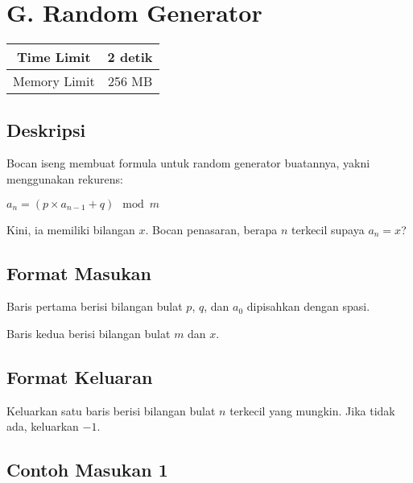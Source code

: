 \documentclass{article}
\begin{document}
\section*{\hfil G. Random Generator\hfil}

\begin{center}
\begin{tabular}{ |cc| } 
 \hline
 Time Limit & 2 detik \\
 \hline 
 Memory Limit & 256 MB \\
 \hline
\end{tabular}
\end{center}

\subsection*{Deskripsi}

\par\noindent Bocan iseng membuat formula untuk random generator buatannya, yakni menggunakan rekurens:

\begin{center}
$a_n = (p \times a_{n-1} + q) \mod m$
\end{center}

\par\noindent Kini, ia memiliki bilangan $x$. Bocan penasaran, berapa $n$ terkecil supaya $a_n = x$?

\subsection*{Format Masukan}

\par\noindent Baris pertama berisi bilangan bulat $p$, $q$, dan $a_0$ dipisahkan dengan spasi.
\par\noindent Baris kedua berisi bilangan bulat $m$ dan $x$.

\subsection*{Format Keluaran}

\par\noindent Keluarkan satu baris berisi bilangan bulat $n$ terkecil yang mungkin. Jika tidak ada, keluarkan $-1$.

\subsection*{Contoh Masukan 1}
\end{document}
